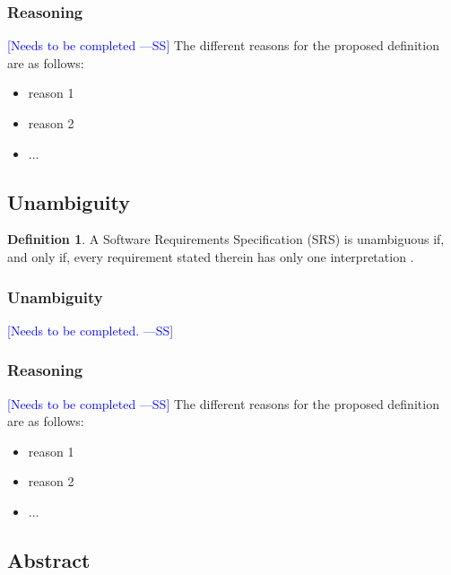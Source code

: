 \documentclass[letterpaper, cleveref]{lipics-v2019}
\newcommand{\authornote}[3]{\textcolor{#1}{[#3 ---#2]}}
\newcommand{\authornote}[3]{}
\newcommand{\wss}[1]{\authornote{blue}{SS}{#1}} %
\newcommand{\notdone}[1]{\textcolor{red}{#1}}
\theoremstyle{definition}
\newtheorem{defn}{Definition}
\begin{document}
\subsubsection*{Reasoning}

\wss{Needs to be completed}  The different reasons for the proposed definition
are as follows:

\begin{itemize}
  \item reason 1
  \item reason 2
  \item ...
\end{itemize}


\subsection{Unambiguity} %

\begin{defn}
 A Software Requirements Specification (SRS) is unambiguous if, and only if,
 every requirement stated therein has only one interpretation \citep{IEEE1998}.
\end{defn}

\begin{mybox}
\subsubsection*{Unambiguity} 
\wss{Needs to be completed.}
\end{mybox}

\subsubsection*{Reasoning}

\wss{Needs to be completed}  The different reasons for the proposed definition
are as follows:

\begin{itemize}
  \item reason 1
  \item reason 2
  \item ...
\end{itemize}


\subsection{Abstract} %
\end{document}
